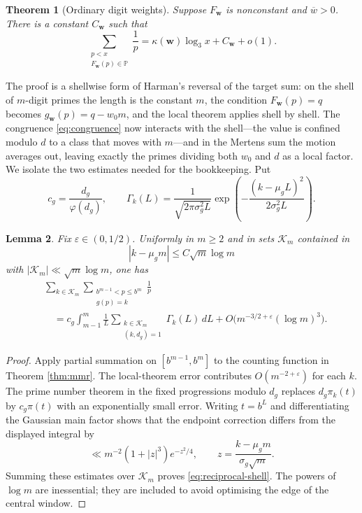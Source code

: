 \documentclass[11pt,reqno]{amsart}
\theoremstyle{plain}
\newtheorem{theorem}{Theorem}[section]
\newtheorem{lemma}[theorem]{Lemma}
\theoremstyle{definition}
\newcommand{\Pp}{\mathbb{P}}
\newcommand{\eps}{\varepsilon}
\newcommand{\1}{\mathbf 1}
\begin{document}
\begin{theorem}[Ordinary digit weights]\label{thm:digitweights-intro}
Suppose $F_{\mathbf w}$ is nonconstant and $\overline w>0$.  There is a constant $C_{\mathbf w}$ such that
\[
 \sum_{\substack{p<x\\F_{\mathbf w}(p)\in\Pp}}\frac1p
 =\kappa(\mathbf w)\log_3x+C_{\mathbf w}+o(1).
\]
\end{theorem}

The proof is a shellwise form of Harman's reversal of the target sum: on the shell of $m$-digit primes the length is the constant $m$, the condition $F_{\mathbf w}(p)=q$ becomes $g_{\mathbf w}(p)=q-w_0m$, and the local theorem applies shell by shell.  The congruence \eqref{eq:congruence} now interacts with the shell---the value is confined modulo $d$ to a class that moves with $m$---and in the Mertens sum the motion averages out, leaving exactly the primes dividing both $w_0$ and $d$ as a local factor.  We isolate the two estimates needed for the bookkeeping.  Put
\[
 c_g=\frac{d_g}{\varphi(d_g)},\qquad
 \Gamma_k(L)=\frac1{\sqrt{2\pi\sigma_g^2L}}
 \exp\left(-\frac{(k-\mu_gL)^2}{2\sigma_g^2L}\right).
\]

\begin{lemma}\label{lem:reciprocal-shell}
Fix $\eps\in(0,1/2)$.  Uniformly in $m\ge2$ and in sets $\mathcal K_m$ contained in
\[
 |k-\mu_gm|\le C\sqrt m\log m
\]
with $|\mathcal K_m|\ll\sqrt m\log m$, one has
\begin{equation}\label{eq:reciprocal-shell}
\begin{split}
 &\sum_{k\in\mathcal K_m}
 \sum_{\substack{b^{m-1}<p\le b^m\\g(p)=k}}\frac1p\\
 &\quad=c_g\int_{m-1}^m\frac1L
 \sum_{\substack{k\in\mathcal K_m\\(k,d_g)=1}}
 \Gamma_k(L)\,dL
 +O\big(m^{-3/2+\eps}(\log m)^3\big).
\end{split}
\end{equation}
\end{lemma}

\begin{proof}
Apply partial summation on $[b^{m-1},b^m]$ to the counting function in Theorem \ref{thm:mmr}.  The local-theorem error contributes $O(m^{-2+\eps})$ for each $k$.  The prime number theorem in the fixed progressions modulo $d_g$ replaces $d_g\pi_k(t)$ by $c_g\pi(t)$ with an exponentially small error.  Writing $t=b^L$ and differentiating the Gaussian main factor shows that the endpoint correction differs from the displayed integral by
\[
 \ll m^{-2}(1+|z|^3)e^{-z^2/4},\qquad
 z=\frac{k-\mu_gm}{\sigma_g\sqrt m}.
\]
Summing these estimates over $\mathcal K_m$ proves \eqref{eq:reciprocal-shell}.  The powers of $\log m$ are inessential; they are included to avoid optimising the edge of the central window.
\end{proof}
\end{document}
